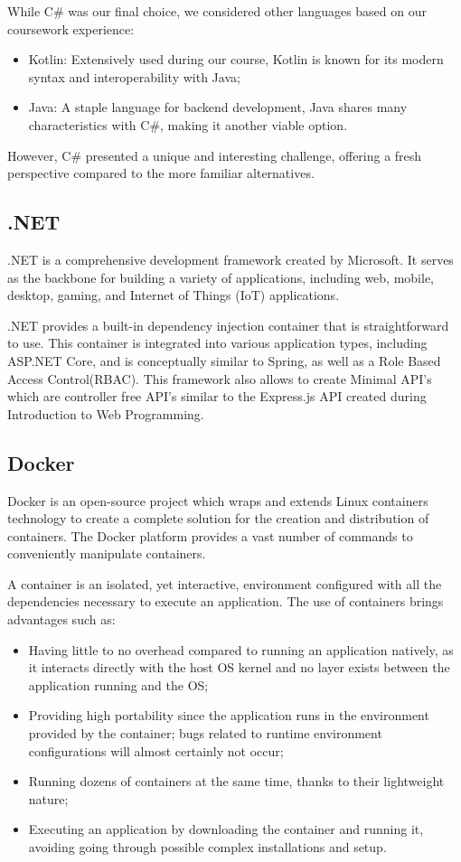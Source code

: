 While C\# was our final choice, we considered other languages based on our coursework experience:
\begin{itemize}
	\item Kotlin: Extensively used during our course, Kotlin is known for its modern syntax and interoperability with Java;
	\item Java: A staple language for backend development, Java shares many characteristics with C\#, making it another viable option.
\end{itemize}

However, C\# presented a unique and interesting challenge, offering a fresh perspective compared to the more familiar alternatives.

\subsection{.NET}
.NET is a comprehensive development framework created by Microsoft. It serves as the backbone for building a variety of applications, including web, mobile, desktop, gaming, and Internet of Things (IoT) applications.

.NET provides a built-in dependency injection container that is straightforward to use. This container is integrated into various application types, including ASP.NET Core, and is conceptually similar to Spring, as well as a Role Based Access Control(RBAC). This framework also allows to create Minimal API's which are controller free API's similar to the Express.js API created during Introduction to Web Programming.

\subsection{Docker}

Docker is an open-source project which wraps and extends Linux containers technology to create a complete solution for the creation and distribution of containers.
The Docker platform provides a vast number of commands to conveniently manipulate
containers.

A container is an isolated, yet interactive, environment configured with all the dependencies necessary to execute an application. The use of containers brings advantages
such as:
\begin{itemize}
	\item Having little to no overhead compared to running an application natively, as it interacts directly with the host OS kernel and no layer exists between the application running and the OS;
	\item Providing high portability since the application runs in the environment provided by the container; bugs related to runtime environment configurations will almost certainly not occur;
	\item Running dozens of containers at the same time, thanks to their lightweight nature;
	\item Executing an application by downloading the container and running it, avoiding going through possible complex installations and setup.
\end{itemize}

